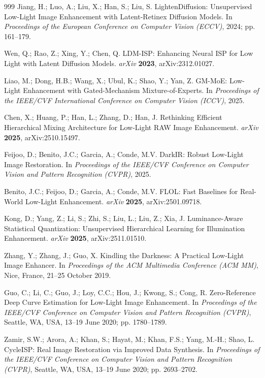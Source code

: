 \documentclass[remotesensing,article,accept,moreauthors]{Definitions/mdpi}
\begin{document}
\begin{thebibliography}{999}
Jiang, H.; Luo, A.; Liu, X.; Han, S.; Liu, S. LightenDiffusion: Unsupervised Low-Light Image Enhancement with Latent-Retinex Diffusion Models. In \emph{Proceedings of the European Conference on Computer Vision (ECCV)}, 2024; pp. 161--179.

Wen, Q.; Rao, Z.; Xing, Y.; Chen, Q. LDM-ISP: Enhancing Neural ISP for Low Light with Latent Diffusion Models. \emph{arXiv} {\bf 2023}, arXiv:2312.01027.

Liao, M.; Dong, H.B.; Wang, X.; Ubul, K.; Shao, Y.; Yan, Z. GM-MoE: Low-Light Enhancement with Gated-Mechanism Mixture-of-Experts. In \emph{Proceedings of the IEEE/CVF International Conference on Computer Vision (ICCV)}, 2025.

Chen, X.; Huang, P.; Han, L.; Zhang, D.; Han, J. Rethinking Efficient Hierarchical Mixing Architecture for Low-Light RAW Image Enhancement. \emph{arXiv} {\bf 2025}, arXiv:2510.15497.

Feijoo, D.; Benito, J.C.; Garcia, A.; Conde, M.V. DarkIR: Robust Low-Light Image Restoration. In \emph{Proceedings of the IEEE/CVF Conference on Computer Vision and Pattern Recognition (CVPR)}, 2025.

Benito, J.C.; Feijoo, D.; Garcia, A.; Conde, M.V. FLOL: Fast Baselines for Real-World Low-Light Enhancement. \emph{arXiv} {\bf 2025}, arXiv:2501.09718.

Kong, D.; Yang, Z.; Li, S.; Zhi, S.; Liu, L.; Liu, Z.; Xia, J. Luminance-Aware Statistical Quantization: Unsupervised Hierarchical Learning for Illumination Enhancement. \emph{arXiv} {\bf 2025}, arXiv:2511.01510.

Zhang, Y.; Zhang, J.; Guo, X. Kindling the Darkness: A Practical Low-Light Image Enhancer. In \emph{Proceedings of the ACM Multimedia Conference (ACM MM)}, Nice, France, 21--25 October 2019.

Guo, C.; Li, C.; Guo, J.; Loy, C.C.; Hou, J.; Kwong, S.; Cong, R. Zero-Reference Deep Curve Estimation for Low-Light Image Enhancement. In \emph{Proceedings of the IEEE/CVF Conference on Computer Vision and Pattern Recognition (CVPR)}, Seattle, WA, USA, 13--19 June 2020; pp. 1780--1789.

Zamir, S.W.; Arora, A.; Khan, S.; Hayat, M.; Khan, F.S.; Yang, M.-H.; Shao, L. CycleISP: Real Image Restoration via Improved Data Synthesis. In \emph{Proceedings of the IEEE/CVF Conference on Computer Vision and Pattern Recognition (CVPR)}, Seattle, WA, USA, 13--19 June 2020; pp. 2693--2702.


\end{thebibliography}
\end{document}
